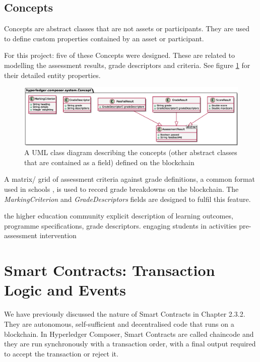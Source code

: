 \subsection{Concepts}

Concepts are abstract classes that are not assets or participants. They are used to define custom properties contained by an asset or participant.

For this project: five of these Concepts were designed. These are related to modelling the assessment results, grade descriptors and criteria. 
See figure \ref{fig:concepts} for their detailed entity properties.

\begin{figure}[!ht] 
    \centering    
    \includegraphics[width=1.0\textwidth]{concepts}
    \caption[Concepts Class Diagram]
        {A UML class diagram describing the concepts (other abstract classes that are contained as a field) defined on the blockchain} 
    \label{fig:concepts}
\end{figure}

A matrix/ grid of assessment criteria against grade definitions, a common format used in schools \citep[p.102]{bryan2006innovative}, 
is used to record grade breakdowns on the blockchain. The \textit{MarkingCriterion} and \textit{GradeDescriptors} fields are designed to 
fulfil this feature.

the higher education community explicit description of learning outcomes, programme specifications, grade descriptors.
engaging students in activities pre-assessment intervention

\section{Smart Contracts: Transaction Logic and Events}

We have previously discussed the nature of Smart Contracts in Chapter 2.3.2. They are autonomous, self-sufficient and 
decentralised code that runs on a blockchain. In Hyperledger Composer, Smart Contracts are called chaincode and 
they are run synchronously with a transaction order, with a final output required to accept the transaction or reject it.

